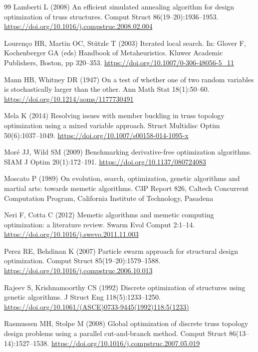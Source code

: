\documentclass[lineno,pdflatex,sn-mathphys-num]{sn-jnl}
\begin{document}
\begin{thebibliography}{99}
Lamberti L (2008) An efficient simulated annealing algorithm for design optimization of truss structures. Comput Struct 86(19--20):1936--1953. \url{https://doi.org/10.1016/j.compstruc.2008.02.004}

Louren\c{c}o HR, Martin OC, St\"utzle T (2003) Iterated local search. In: Glover F, Kochenberger GA (eds) Handbook of Metaheuristics. Kluwer Academic Publishers, Boston, pp 320--353. \url{https://doi.org/10.1007/0-306-48056-5_11}

Mann HB, Whitney DR (1947) On a test of whether one of two random variables is stochastically larger than the other. Ann Math Stat 18(1):50--60. \url{https://doi.org/10.1214/aoms/1177730491}

Mela K (2014) Resolving issues with member buckling in truss topology optimization using a mixed variable approach. Struct Multidisc Optim 50(6):1037--1049. \url{https://doi.org/10.1007/s00158-014-1095-x}

Mor\'e JJ, Wild SM (2009) Benchmarking derivative-free optimization algorithms. SIAM J Optim 20(1):172--191. \url{https://doi.org/10.1137/080724083}

Moscato P (1989) On evolution, search, optimization, genetic algorithms and martial arts: towards memetic algorithms. C3P Report 826, Caltech Concurrent Computation Program, California Institute of Technology, Pasadena

Neri F, Cotta C (2012) Memetic algorithms and memetic computing optimization: a literature review. Swarm Evol Comput 2:1--14. \url{https://doi.org/10.1016/j.swevo.2011.11.003}

Perez RE, Behdinan K (2007) Particle swarm approach for structural design optimization. Comput Struct 85(19--20):1579--1588. \url{https://doi.org/10.1016/j.compstruc.2006.10.013}

Rajeev S, Krishnamoorthy CS (1992) Discrete optimization of structures using genetic algorithms. J Struct Eng 118(5):1233--1250. \url{https://doi.org/10.1061/(ASCE)0733-9445(1992)118:5(1233)}

Rasmussen MH, Stolpe M (2008) Global optimization of discrete truss topology design problems using a parallel cut-and-branch method. Comput Struct 86(13--14):1527--1538. \url{https://doi.org/10.1016/j.compstruc.2007.05.019}


\end{thebibliography}
\end{document}
